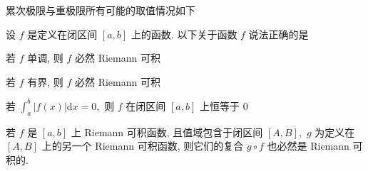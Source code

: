 \begin{solution}
累次极限与重极限所有可能的取值情况如下

\begin{table}[H]
\centering

\end{table}
\end{solution}



\begin{question}
设 $f$ 是定义在闭区间 $[a, b]$ 上的函数. 以下关于函数 $f$ 说法正确的是 \paren[A]

\begin{choices}
\item 若 $f$ 单调, 则 $f$ 必然 Riemann 可积
\item 若 $f$ 有界, 则 $f$ 必然 Riemann 可积
\item 若 $\int_a^b \lvert f(x) \rvert \mathrm{d} x = 0,$ 则 $f$ 在闭区间 $[a, b]$ 上恒等于 $0$
\item 若 $f$ 是 $[a, b]$ 上 Riemann 可积函数, 且值域包含于闭区间 $[A, B],$ $g$ 为定义在 $[A, B]$ 上的另一个 Riemann 可积函数, 则它们的复合 $g\circ f$ 也必然是 Riemann 可积的.
\end{choices}
\end{question}


